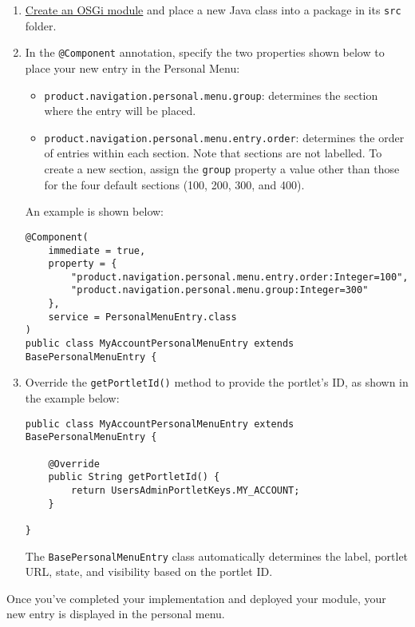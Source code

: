 \begin{enumerate}
\def\labelenumi{\arabic{enumi}.}
\item
  \href{/docs/7-2/reference/-/knowledge_base/r/creating-a-project}{Create
  an OSGi module} and place a new Java class into a package in its
  \texttt{src} folder.
\item
  In the \texttt{@Component} annotation, specify the two properties
  shown below to place your new entry in the Personal Menu:

  \begin{itemize}
  \item
    \texttt{product.navigation.personal.menu.group}: determines the
    section where the entry will be placed.
  \item
    \texttt{product.navigation.personal.menu.entry.order}: determines
    the order of entries within each section. Note that sections are not
    labelled. To create a new section, assign the \texttt{group}
    property a value other than those for the four default sections
    (100, 200, 300, and 400).
  \end{itemize}

  An example is shown below:

\begin{verbatim}
@Component(
    immediate = true,
    property = {
        "product.navigation.personal.menu.entry.order:Integer=100",
        "product.navigation.personal.menu.group:Integer=300"
    },
    service = PersonalMenuEntry.class
)
public class MyAccountPersonalMenuEntry extends BasePersonalMenuEntry {
\end{verbatim}
\item
  Override the \texttt{getPortletId()} method to provide the portlet's
  ID, as shown in the example below:

\begin{verbatim}
public class MyAccountPersonalMenuEntry extends BasePersonalMenuEntry {

    @Override
    public String getPortletId() {
        return UsersAdminPortletKeys.MY_ACCOUNT;
    }

}
\end{verbatim}

  The \texttt{BasePersonalMenuEntry} class automatically determines the
  label, portlet URL, state, and visibility based on the portlet ID.
\end{enumerate}

Once you've completed your implementation and deployed your module, your
new entry is displayed in the personal menu.

